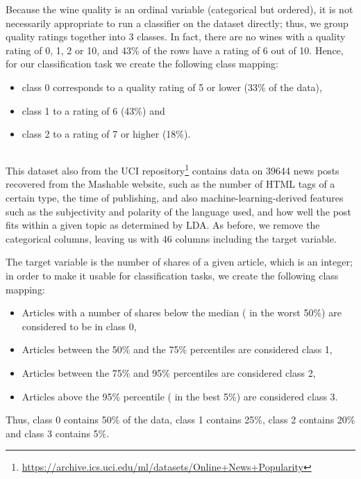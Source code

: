 \documentclass[../main.tex]{subfiles}
\begin{document}
Because the wine quality is an ordinal variable (categorical but ordered), it is not necessarily appropriate to run a classifier on the dataset directly;
thus, we group quality ratings together into 3 classes.
In fact, there are no wines with a quality rating of 0, 1, 2 or 10, and 43\% of the rows have a rating of 6 out of 10.
Hence, for our classification task we create the following class mapping:
\begin{itemize}
    \item class 0 corresponds to a quality rating of 5 or lower (33\% of the data),
    \item class 1 to a rating of 6 (43\%) and
    \item class 2 to a rating of 7 or higher (18\%).
\end{itemize}

\subsection{\OnlineNewsPopularity}

This dataset \cite{fernandesProactive2015} also from the UCI repository\footnote{\url{https://archive.ics.uci.edu/ml/datasets/Online+News+Popularity}} contains data on 39644 news posts recovered from the Mashable website, such as the number of HTML tags of a certain type, the time of publishing, and also machine-learning-derived features such as the subjectivity and polarity of the language used, and how well the post fits within a given topic as determined by LDA.
As before, we remove the categorical columns, leaving us with 46 columns including the target variable.

The target variable is the number of shares of a given article, which is an integer; in order to make it usable for classification tasks, we create the following class mapping:
\begin{itemize}
    \item Articles with a number of shares below the median (\ie{} in the worst 50\%) are considered to be in class 0,
    \item Articles between the 50\% and the 75\% percentiles are considered class 1,
    \item Articles between the 75\% and 95\% percentiles are considered class 2,
\item Articles above the 95\% percentile (\ie{} in the best 5\%) are considered class 3.
\end{itemize}
Thus, class 0 contains 50\% of the data, class 1 contains 25\%, class 2 contains 20\% and class 3 contains 5\%.
\end{document}
